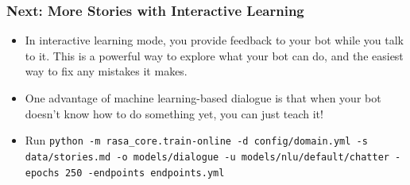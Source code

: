  \begin{frame}[fragile]\frametitle{Next: More Stories with Interactive Learning}
\begin{itemize}
\item In interactive learning mode, you provide feedback to your bot while you talk to it. This is a powerful way to explore what your bot can do, and the easiest way to fix any mistakes it makes. 
\item One advantage of machine learning-based dialogue is that when your bot doesn’t know how to do something yet, you can just teach it!
\item Run \lstinline|python -m rasa_core.train-online -d config/domain.yml -s data/stories.md -o models/dialogue -u models/nlu/default/chatter -epochs 250 -endpoints endpoints.yml|
\end{itemize}
\end{frame}
